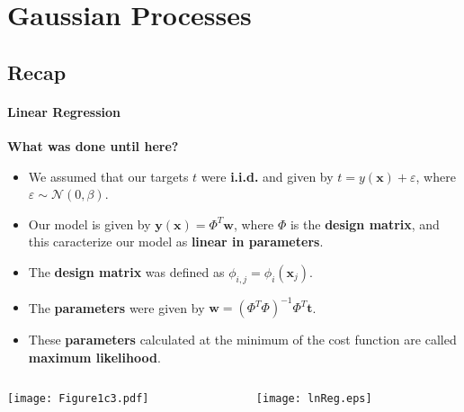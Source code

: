 \section{Gaussian Processes}
\framecard{\insertsection}

\subsection{Recap}
\begin{frame}{\insertsubsection}
    \framesubtitle{Linear Regression} 

    \textcolor{UniGold}{\textbf{What was done until here?}}
    \begin{itemize}
        \item We assumed that our targets $t$ were \textcolor{UniOrange}{\textbf{i.i.d.}} and given by $t = y(\mathbf{x}) + \varepsilon$, where $\varepsilon \sim \mathcal{N}(0,\beta)$.
        \item Our model is given by $\mathbf{y}(\mathbf{x}) = \Phi^T \mathbf{w}$, where $\Phi$ is the \textcolor{UniOrange}{\textbf{design matrix}}, and this caracterize our model as \textcolor{UniOrange}{\textbf{linear in parameters}}.
        \item The \textcolor{UniOrange}{\textbf{design matrix}} was defined as $ \phi_{i,j} = \phi_i(\mathbf{x}_j)$.
        \item The \textcolor{UniOrange}{\textbf{parameters}} were given by $\mathbf{w} = \left( \Phi^T \Phi \right)^{-1}\Phi^T \mathbf{t}$.
        \item These \textcolor{UniOrange}{\textbf{parameters}} calculated at the minimum of the cost function are called \textcolor{UniOrange}{\textbf{maximum likelihood}}.
    \end{itemize}
    \begin{columns}
        \begin{column}{0.5\linewidth}  
        \begin{center}
        \centering
        \texttt{[image: Figure1c3.pdf]}
         \end{center}
    \end{column}
    \begin{column}{0.5\linewidth}  %
        \begin{center}
        \centering
        \texttt{[image: lnReg.eps]}
         \end{center}
    \end{column}
    \end{columns}

\end{frame}

